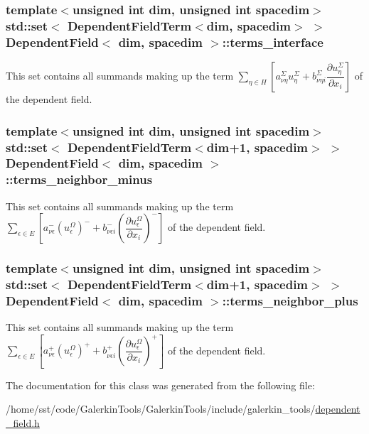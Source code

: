 \subsubsection[{\texorpdfstring{terms\+\_\+interface}{terms_interface}}]{\setlength{\rightskip}{0pt plus 5cm}template$<$unsigned int dim, unsigned int spacedim$>$ std\+::set$<$ {\bf Dependent\+Field\+Term}$<$dim, spacedim$>$ $>$ {\bf Dependent\+Field}$<$ dim, spacedim $>$\+::terms\+\_\+interface\hspace{0.3cm}{\ttfamily [private]}}\hypertarget{class_dependent_field_aa6326d64fd7828c935946136ec5ec122}{}\label{class_dependent_field_aa6326d64fd7828c935946136ec5ec122}
This set contains all summands making up the term $\sum_{\eta \in H} \left[ a^\Sigma_{\nu\eta} u^\Sigma_\eta + b^\Sigma_{\nu\eta i} \dfrac{\partial u^\Sigma_\eta}{\partial x_i} \right]$ of the dependent field. 
\subsubsection[{\texorpdfstring{terms\+\_\+neighbor\+\_\+minus}{terms_neighbor_minus}}]{\setlength{\rightskip}{0pt plus 5cm}template$<$unsigned int dim, unsigned int spacedim$>$ std\+::set$<$ {\bf Dependent\+Field\+Term}$<$dim+1, spacedim$>$ $>$ {\bf Dependent\+Field}$<$ dim, spacedim $>$\+::terms\+\_\+neighbor\+\_\+minus\hspace{0.3cm}{\ttfamily [private]}}\hypertarget{class_dependent_field_a9ac1d390137d52ef6c58b230d540ce38}{}\label{class_dependent_field_a9ac1d390137d52ef6c58b230d540ce38}
This set contains all summands making up the term $\sum_{\epsilon \in E} \left[ a^-_{\nu\epsilon} (u^\Omega_\epsilon)^- + b^-_{\nu\epsilon i} \left(\dfrac{\partial u^\Omega_\epsilon}{\partial x_i}\right)^- \right]$ of the dependent field. 
\subsubsection[{\texorpdfstring{terms\+\_\+neighbor\+\_\+plus}{terms_neighbor_plus}}]{\setlength{\rightskip}{0pt plus 5cm}template$<$unsigned int dim, unsigned int spacedim$>$ std\+::set$<$ {\bf Dependent\+Field\+Term}$<$dim+1, spacedim$>$ $>$ {\bf Dependent\+Field}$<$ dim, spacedim $>$\+::terms\+\_\+neighbor\+\_\+plus\hspace{0.3cm}{\ttfamily [private]}}\hypertarget{class_dependent_field_a05ba04a9f0f50fd881055f3abf46c9f5}{}\label{class_dependent_field_a05ba04a9f0f50fd881055f3abf46c9f5}
This set contains all summands making up the term $\sum_{\epsilon \in E} \left[ a^+_{\nu\epsilon} (u^\Omega_\epsilon)^+ + b^+_{\nu\epsilon i} \left(\dfrac{\partial u^\Omega_\epsilon}{\partial x_i}\right)^+ \right]$ of the dependent field. 

The documentation for this class was generated from the following file\+:\begin{DoxyCompactItemize}
\item 
/home/sst/code/\+Galerkin\+Tools/\+Galerkin\+Tools/include/galerkin\+\_\+tools/\hyperlink{dependent__field_8h}{dependent\+\_\+field.\+h}\end{DoxyCompactItemize}

